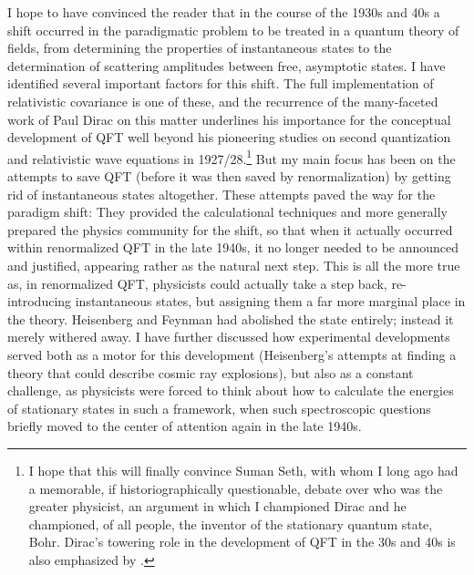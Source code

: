 \documentclass[12pt,a4paper]{article}
\begin{document}
I hope to have convinced the reader that in the course of the 1930s and 40s a shift occurred in the paradigmatic problem to be treated in a quantum theory of fields, from determining the properties of instantaneous states to the determination of scattering amplitudes between free, asymptotic states. I have identified several important factors for this shift. The full implementation of relativistic covariance is one of these, and the recurrence of the many-faceted work of Paul Dirac on this matter underlines his importance for the conceptual development of QFT well beyond his pioneering studies on second quantization and relativistic wave equations in 1927/28.\footnote{I hope that this will finally convince Suman Seth, with whom I long ago had a memorable, if historiographically questionable, debate over who was the greater physicist, an argument in which I championed Dirac and he championed, of all people, the inventor of the stationary quantum state, Bohr. Dirac's towering role in the development of QFT in the 30s and 40s is also emphasized by \cite[p. 573]{schweber_1994_qed}.} But my main focus has been on the attempts to save QFT (before it was then saved by renormalization) by getting rid of instantaneous states altogether. These attempts paved the way for the paradigm shift: They provided the calculational techniques and more generally prepared the physics community for the shift, so that when it actually occurred within renormalized QFT in the late 1940s, it no longer needed to be announced and justified, appearing rather as the natural next step. This is all the more true as, in renormalized QFT, physicists could actually take a step back, re-introducing instantaneous states, but assigning them a far more marginal place in the theory. Heisenberg and Feynman had abolished the state entirely; instead it merely withered away. I have further discussed how experimental developments served both as a motor for this development (Heisenberg's attempts at finding a theory that could describe cosmic ray explosions), but also as a constant challenge, as physicists were forced to think about how to calculate the energies of stationary states in such a framework, when such spectroscopic questions briefly moved to the center of attention again in the late 1940s.
\end{document}
